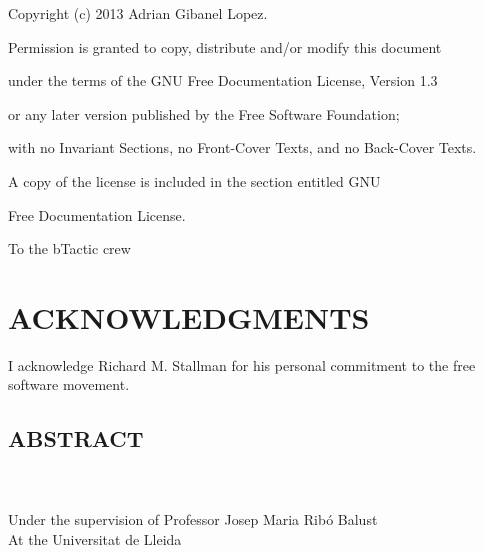 Copyright (c) 2013 Adrian Gibanel Lopez.

Permission is granted to copy, distribute and/or modify this document

under the terms of the GNU Free Documentation License, Version 1.3

or any later version published by the Free Software Foundation;

with no Invariant Sections, no Front-Cover Texts, and no Back-Cover
Texts.

A copy of the license is included in the section entitled \textquotedbl{}GNU

Free Documentation License\textquotedbl{}.

\newpage



\newpage
\null\vfil
\begin{center}
To the bTactic crew
\end{center}
\par\vfil\newpage


\chapter*{ACKNOWLEDGMENTS}
I acknowledge Richard M. Stallman for his personal commitment to the free software movement.
\par\newpage





\section* {ABSTRACT}
             \thispagestyle{empty}
                  \addtocounter{page}{-1}
                \begin{center}
                  {\bf\expandafter\uppercase\expandafter{\actualtitle}}\\
                  \vspace{12pt}
                  \actualauthor \\
                  \vspace{12pt}
                  Under the supervision of Professor Josep Maria Rib\'o Balust\\
                  At the Universitat de Lleida
                \end{center}


\pagestyle{headings}

\tableofcontents
\listoffigures
\newpage

\clearpage{} %
